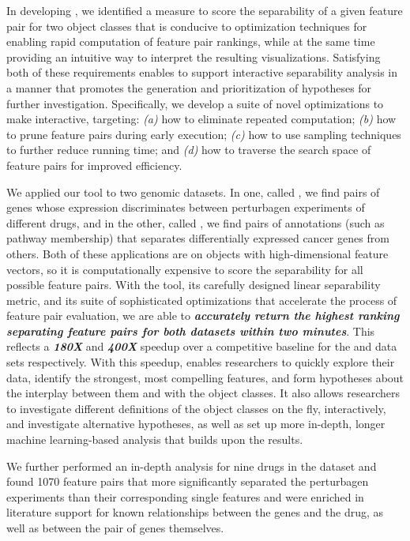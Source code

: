 In developing \genviz,
we identified a measure to score the separability
of a given feature pair for two object classes
that is conducive to
optimization techniques for enabling rapid
computation of feature pair rankings, while at
the same time providing an intuitive way to interpret
the resulting visualizations.
Satisfying both of these requirements 
enables \genviz to support interactive separability analysis 
in a manner that promotes the generation and prioritization 
of hypotheses for further investigation. 
Specifically, we develop a suite of novel 
optimizations to make \genviz interactive, 
targeting: {\em (a)} how to eliminate repeated computation; 
{\em (b)} how to prune feature pairs during early execution; 
{\em (c)} how to use sampling techniques to further reduce running time; 
and {\em (d)} how to traverse the search space 
of feature pairs for improved efficiency.

We applied our \genviz tool to two genomic datasets.
In one, called \lincs, we find pairs of genes
whose expression discriminates between perturbagen experiments
of different drugs, and in the other, called \msig,
we find pairs of annotations (such as pathway membership)
that separates differentially expressed 
cancer genes from others.
Both of these applications are on 
objects with high-dimensional feature vectors,
so it is computationally expensive to score the separability
for all possible feature pairs.
With the \genviz tool, its carefully designed 
linear separability metric,
and its suite of sophisticated optimizations 
that accelerate the process of feature pair evaluation,
we are able to {\bf \em accurately return the 
highest ranking separating
feature pairs for both datasets  within two minutes}.
This reflects a {\bf \em 180X} and {\bf \em 400X} speedup
over a competitive baseline for the \msig and \lincs data sets respectively.
With this speedup, \genviz enables researchers to quickly explore their data,
identify the strongest, most compelling features,
and form hypotheses about the interplay between them and with the object classes.
It also allows researchers to investigate different definitions
of the object classes on the fly, interactively,
and investigate alternative hypotheses,
as well as set up more in-depth,
longer machine learning-based analysis 
that builds upon the \genviz results.

We further performed an in-depth analysis
for nine drugs in the \lincs dataset and
found 1070 feature pairs that more significantly
separated the perturbagen experiments than their
corresponding single features and were enriched
in literature support for known relationships between the genes and the drug,
as well as between the pair of genes themselves.

